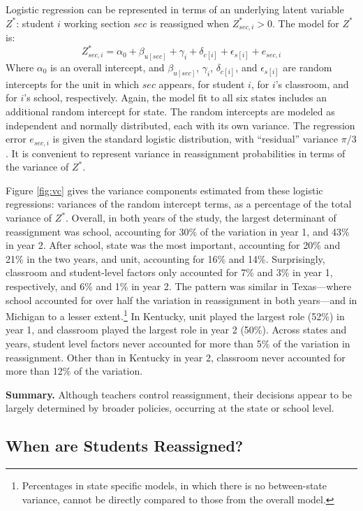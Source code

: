 \documentclass[notitlepage,12pt]{jedm}\usepackage[]{graphicx}\usepackage[]{color}
\begin{document}
Logistic regression can be represented in terms of an underlying
latent variable $Z^*$: student $i$ working section $sec$ is reassigned
when $Z_{sec,i}^*>0$.
The model for $Z^*$ is:
\begin{equation*}
 Z^*_{sec,i}=\alpha_0+\beta_{u[sec]}+\gamma_i+\delta_{c[i]}+\epsilon_{s[i]}+e_{sec,i}
\end{equation*}
Where $\alpha_0$ is an overall intercept,
and $\beta_{u[sec]}$, $\gamma_i$, $\delta_{c[i]}$, and $\epsilon_{s[i]}$
are random intercepts for the unit in which $sec$ appears, for student
$i$, for $i$'s classroom, and for $i$'s school, respectively.
Again, the model fit to all six states includes an additional random
intercept for state.
The random intercepts are modeled as independent and normally
distributed, each with its own variance.
The regression error $e_{sec,i}$ is given the standard logistic
distribution, with ``residual'' variance $\pi/3$.
It is convenient to represent variance in reassignment probabilities
in terms of the variance of $Z^*$.

Figure \ref{fig:vc} gives the variance components estimated from these
logistic regressions: variances of the random intercept terms, as a
percentage of the total variance of $Z^*$.
Overall, in both years of the study, the largest determinant of
reassignment was school, accounting for
30\% of the variation in year 1,
and 43\% in year 2.
After school, state was the most important, accounting for
20\% and
21\% in the two years, and unit,
accounting for 16\% and 14\%.
Surprisingly, classroom and student-level factors only accounted for
7\% and
3\% in year 1, respectively,
and 6\% and
1\% in year 2.
The pattern was similar in Texas---where school accounted for over half
the variation in reassignment in both years---and in Michigan to a
lesser extent.\footnote{Percentages in state specific models, in which
  there is no between-state variance, cannot be
  directly compared to those from the overall model.}
In Kentucky, unit played the largest role
(52\%) in year 1, and classroom played
the largest role in year 2 (50\%).
Across states and years, student level factors never accounted for
more than 5\% of
the variation in reassignment.
Other than in Kentucky in year 2, classroom never accounted for more
than 12\%  of
the variation.

\textbf{Summary.} Although teachers control reassignment, their decisions appear to be largely
determined by broader policies, occurring at the state or school level.


\subsection{When are Students Reassigned?}
\end{document}

